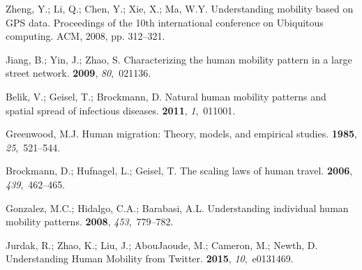 \documentclass[ijgi,article,accept,moreauthors,pdftex,10pt,a4paper]{mdpi}
\theoremstyle{mdpi}
\newcounter{ex}
\newcounter{re}
\theoremstyle{mdpidefinition}
\begin{document}

\renewcommand\bibname{References}
\begin{thebibliography}{-------}
\providecommand{\natexlab}[1]{#1}

Zheng, Y.; Li, Q.; Chen, Y.; Xie, X.; Ma, W.Y.
\newblock Understanding mobility based on GPS data.
\newblock  Proceedings of the 10th international conference on Ubiquitous
  computing. ACM,  2008, pp. 312--321.

Jiang, B.; Yin, J.; Zhao, S.
\newblock Characterizing the human mobility pattern in a large street network.
 {\bf 2009}, {\em 80},~021136.

Belik, V.; Geisel, T.; Brockmann, D.
\newblock Natural human mobility patterns and spatial spread of infectious
  diseases.
 {\bf 2011}, {\em 1},~011001.

Greenwood, M.J.
\newblock Human migration: Theory, models, and empirical studies.
 {\bf 1985}, {\em 25},~521--544.

Brockmann, D.; Hufnagel, L.; Geisel, T.
\newblock The scaling laws of human travel.
 {\bf 2006}, {\em 439},~462--465.

Gonzalez, M.C.; Hidalgo, C.A.; Barabasi, A.L.
\newblock Understanding individual human mobility patterns.
 {\bf 2008}, {\em 453},~779--782.

Jurdak, R.; Zhao, K.; Liu, J.; AbouJaoude, M.; Cameron, M.; Newth, D.
\newblock Understanding Human Mobility from Twitter.
 {\bf 2015}, {\em 10},~e0131469.


\end{thebibliography}
\end{document}
